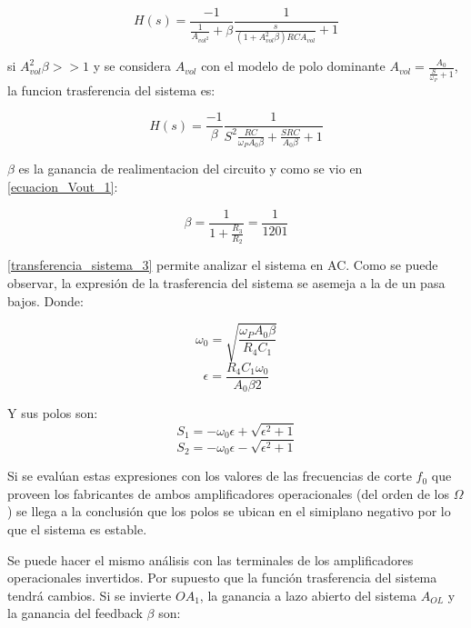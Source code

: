 \begin{equation} H (s) = \frac{-1}{\frac{1}{A_{vol^2}}+\beta}\frac{1}{\frac{s}{(1+A_{vol}^2\beta)RC A_{vol}}+1} \label{transferencia_sistema_2}  \end{equation}

si $A_{vol}^2 \beta >> 1 $  y se considera $A_{vol}$ con el modelo de polo dominante $A_{vol} = \frac{A_0}{\frac{S}{\omega_P}+1}$, la funcion trasferencia del sistema es:

\begin{equation} H (s) = \frac{-1}{\beta} \frac{1}{S^2\frac{RC}{\omega_P A_0 \beta} + \frac{S R C}{A_0 \beta} +1 } \label{transferencia_sistema_3}  \end{equation}

$\beta$ es la ganancia de realimentacion del circuito y como se vio en \ref{ecuacion_Vout_1}:

\begin{equation} \beta =  \frac{1}{1+ \frac{R_3}{R_2}} = \frac{1}{1201} \label{beta}  \end{equation}

\ref{transferencia_sistema_3} permite analizar el sistema en AC. Como se puede observar, la expresión de la trasferencia del sistema se asemeja a la de un pasa bajos. Donde:


\begin{displaymath} \omega_0 = \sqrt{\frac{\omega_P A_{0} \beta}{R_4 C_1}} \end{displaymath}
\begin{displaymath} \epsilon = \frac{R_4 C_1 \omega_0}{A_0 \beta 2} \end{displaymath}

Y sus polos son:
\begin{displaymath} S_1 = -\omega_0 \epsilon + \sqrt{\epsilon^2 + 1} \end{displaymath}
\begin{displaymath} S_2 = -\omega_0 \epsilon - \sqrt{\epsilon^2 + 1} \end{displaymath}

Si se evalúan estas expresiones con los valores de las frecuencias de corte $f_0$ que proveen los fabricantes de ambos amplificadores operacionales (del orden de los $\Omega$ ) se llega a la conclusión que los polos 
se ubican en el simiplano negativo por lo que el sistema es estable. 

Se puede hacer el mismo análisis con las terminales de los amplificadores operacionales invertidos. Por supuesto que la función trasferencia del sistema tendrá cambios. Si se invierte $OA_1$, la ganancia a lazo abierto del sistema $A_{OL}$ y la ganancia del feedback $\beta$ son:

